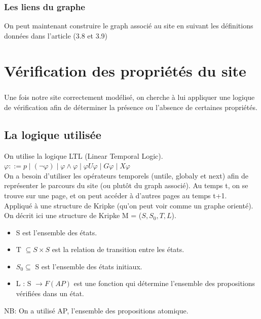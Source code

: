 \documentclass[a4paper]{report}
\begin{document}
\subsection*{ Les liens du graphe\\ }
On peut maintenant construire le graph associé au site en suivant les définitions données dans l'article (3.8 et 3.9)\\




\chapter*{ Vérification des propriétés du site }

\paragraph*{}
Une fois notre site correctement modélisé, on cherche à lui appliquer une logique de vérification afin de déterminer la présence ou l’absence de certaines propriétés.\\

\section*{La logique utilisée}
On utilise la logique LTL (Linear Temporal Logic).\\
$\varphi ::= p \mid (\neg \varphi) \mid \varphi \wedge \varphi \mid \varphi U \varphi \mid G \varphi \mid X \varphi$\\
On a besoin d'utiliser les opérateurs temporels (untile, globaly et next) afin de représenter le parcours du site (ou plutôt du graph associé). Au temps t, on se trouve sur une page, et on peut accéder à d'autres pages au temps t+1.\\

Appliqué à une structure de Kripke (qu'on peut voir comme un graphe orienté).\\
On décrit ici une structure de Kripke M = ($ S, S_0, T, L $).
\begin{itemize}
\item S est l'ensemble des états.
\item T $ \subseteq S \times S $ est la relation de transition entre les états.
\item $S_0 \subseteq$ S est l'ensemble des états initiaux.
\item L : S $ \rightarrow F(AP)$ est une fonction qui détermine l'ensemble des propositions vérifiées dans un état.
\end{itemize}
NB: On a utilisé AP, l'ensemble des propositions atomique.\\
\end{document}
